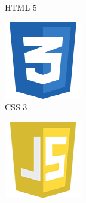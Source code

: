 \begin{figure}[H]
\begin{subfigure}[t]{0.2\linewidth}
		\caption{HTML 5}\label{fig:HTML_5}
	\end{subfigure}
    \quad
	\begin{subfigure}[t]{0.2\linewidth}
		\centering
		\includegraphics[width=\linewidth]{Images/Generic/Icons/CSS_3}
		\caption{CSS 3}\label{fig:CSS_3}
	\end{subfigure}
    \quad
	\begin{subfigure}[t]{0.2\linewidth}
		\centering
		\includegraphics[width=\linewidth]{Images/Generic/Icons/JavaScript}

\end{subfigure}
\end{figure}
